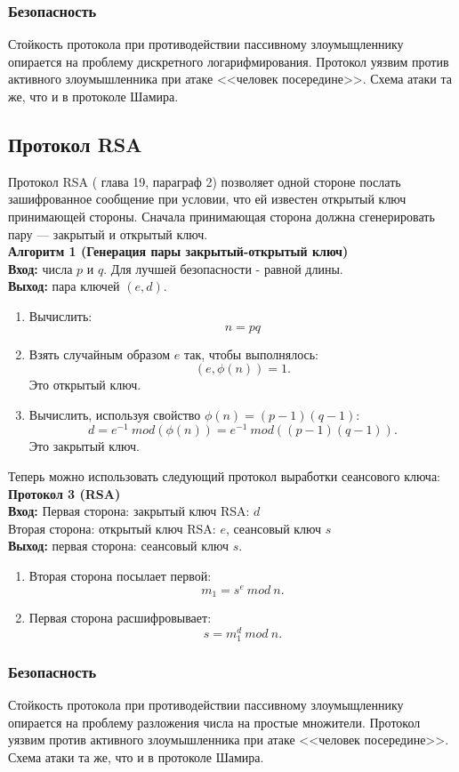 \subsubsection{Безопасность}
Стойкость протокола при противодействии пассивному злоумыщленнику опирается на проблему дискретного логарифмирования. Протокол уязвим против активного злоумышленника при атаке <<человек посередине>>. Схема атаки та же, что и в протоколе Шамира.
\subsection{Протокол RSA}
Протокол RSA (\autocite{Shnayer} глава 19, параграф 2) позволяет одной стороне послать зашифрованное сообщение при условии, что ей известен открытый ключ принимающей стороны. Сначала принимающая сторона должна сгенерировать пару --- закрытый и открытый ключ.\\
\textbf{Алгоритм 1 (Генерация пары закрытый-открытый ключ)}\\
\hspace*{10mm}\textbf{Вход:} числа $p$ и $q$. Для лучшей безопасности - равной длины.\\
\hspace*{10mm}\textbf{Выход:} пара ключей $(e,d).$ 
\begin{enumerate}
	\item Вычислить:
	$$n = pq$$
	\item Взять случайным образом $e$ так, чтобы выполнялось:
	$$(e,\phi(n)) = 1.$$
	Это открытый ключ.
	\item Вычислить, используя свойство $\phi(n)=(p-1)(q-1)$:
	$$d=e^{-1}\ mod(\phi(n)) = e^{-1}\ mod((p-1)(q-1)).$$
	Это закрытый ключ.
\end{enumerate}
Теперь можно использовать следующий протокол выработки сеансового ключа:\\
\textbf{Протокол 3 (RSA)}\\
\hspace*{10mm}\textbf{Вход:}
Первая сторона: закрытый ключ RSA: $d$\\
Вторая сторона: открытый ключ RSA: $e$, сеансовый ключ $s$\\
\hspace*{10mm}\textbf{Выход:} первая сторона: сеансовый ключ $s$.\\
\begin{enumerate}
	\item Вторая сторона посылает первой:
	$$m_{1} = s^{e}\ mod\ n.$$
	\item Первая сторона расшифровывает:
	$$s = m_{1}^{d}\ mod\ n.$$
\end{enumerate}
\subsubsection{Безопасность}
Стойкость протокола при противодействии пассивному злоумыщленнику опирается на проблему разложения числа на простые множители. Протокол уязвим против активного злоумышленника при атаке <<человек посередине>>. Схема атаки та же, что и в протоколе Шамира.